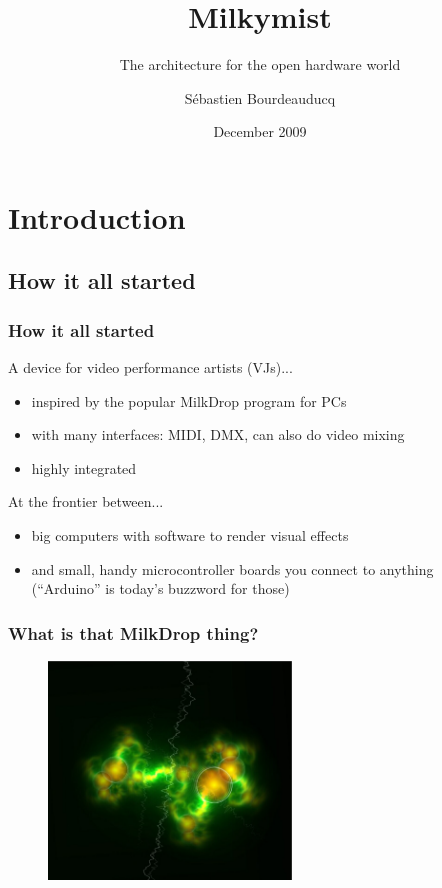 \documentclass{beamer}
\title{Milkymist}
\subtitle{The architecture for the open hardware world}
\author{S\'ebastien Bourdeauducq}
\date{December 2009}
\begin{document}

\section{Introduction}
\subsection{How it all started}
\frame
{
  \frametitle{How it all started}
A device for video performance artists (VJs)...
  \begin{itemize}
  \item inspired by the popular MilkDrop program for PCs
  \item with many interfaces: MIDI, DMX, can also do video mixing
  \item highly integrated
  \end{itemize}

At the frontier between...
  \begin{itemize}
  \item big computers with software to render visual effects
  \item and small, handy microcontroller boards you connect to anything\\(``Arduino'' is today's buzzword for those)
  \end{itemize}
}

\frame
{
  \frametitle{What is that MilkDrop thing?}
  \begin{figure}[H]
  \includegraphics[height=58mm]{milkdrop1.eps}
  \end{figure}
}
\end{document}

